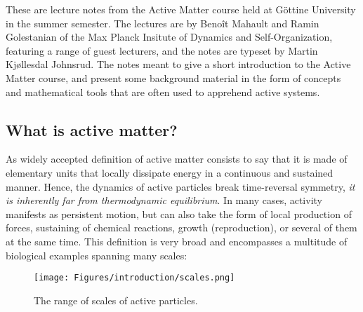 These are lecture notes from the Active Matter course held at Göttine University in the summer semester.
The lectures are by Benoît Mahault and Ramin Golestanian of the Max Planck Insitute of Dynamics and Self-Organization, featuring a range of guest lecturers, and the notes are typeset by Martin Kjøllesdal Johnsrud.
The notes meant to give a short introduction to the Active Matter course, and present some background material in the form of concepts and mathematical tools that are often used to apprehend active systems.



\subsection{What is active matter?}


As widely accepted definition of active matter consists to say that it is made of elementary units that locally dissipate energy in a continuous and sustained manner. Hence, the dynamics of active particles break time-reversal symmetry, \textit{it is inherently far from thermodynamic equilibrium}. In many cases, activity manifests as persistent motion, but can also take the form of local production of forces, sustaining of chemical reactions, growth (reproduction), or several of them at the same time. This definition is very broad and encompasses a multitude of biological examples spanning many scales:

\begin{figure}[!htb]
    \centering
    \texttt{[image: Figures/introduction/scales.png]}
    \caption{The range of scales of active particles.}
    \label{fig: scales active particles}
\end{figure}



